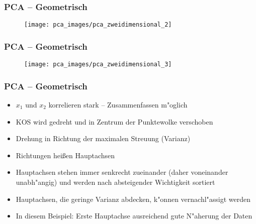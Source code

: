 
\begin{frame}

\frametitle{PCA -- Geometrisch}

\begin{figure}[h]
\centering
\texttt{[image: pca\_images/pca\_zweidimensional\_2]}
\end{figure}

\end{frame}







\begin{frame}

\frametitle{PCA -- Geometrisch}

\begin{figure}[h]
\centering
\texttt{[image: pca\_images/pca\_zweidimensional\_3]}
\end{figure}

\end{frame}







\begin{frame}

\frametitle{PCA -- Geometrisch}

\begin{itemize}
\item $x_1$ und $x_2$ korrelieren stark -- Zusammenfassen m"oglich
\item KOS wird gedreht und in Zentrum der Punktewolke verschoben
\item Drehung in Richtung der maximalen Streuung (Varianz)
\item Richtungen hei{\ss}en Hauptachsen
\item Hauptachsen stehen immer senkrecht zueinander (daher voneinander unabh"angig) und werden nach absteigender Wichtigkeit sortiert
\item Hauptachsen, die geringe Varianz abdecken, k"onnen vernachl"assigt werden
\item In diesem Beispiel: Erste Hauptachse ausreichend gute N"aherung der Daten
\end{itemize}

\end{frame}












